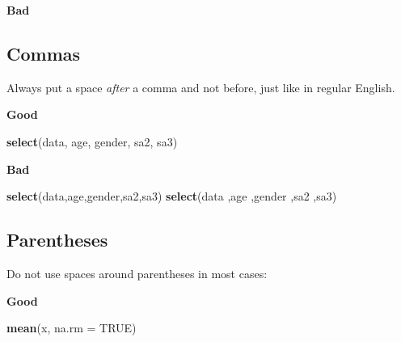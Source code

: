 \documentclass[
]{book}
\newenvironment{Shaded}{\begin{snugshade}}{\end{snugshade}}
\newcommand{\DataTypeTok}[1]{\textcolor[rgb]{0.13,0.29,0.53}{#1}}
\newcommand{\DecValTok}[1]{\textcolor[rgb]{0.00,0.00,0.81}{#1}}
\newcommand{\KeywordTok}[1]{\textcolor[rgb]{0.13,0.29,0.53}{\textbf{#1}}}
\newcommand{\NormalTok}[1]{#1}
\newcommand{\OperatorTok}[1]{\textcolor[rgb]{0.81,0.36,0.00}{\textbf{#1}}}
\newcommand{\OtherTok}[1]{\textcolor[rgb]{0.56,0.35,0.01}{#1}}
\newcommand{\StringTok}[1]{\textcolor[rgb]{0.31,0.60,0.02}{#1}}
\begin{document}
\textbf{Bad}

\begin{Shaded}
\end{Shaded}

\hypertarget{commas}{%
\subsection{Commas}\label{commas}}

Always put a space \emph{after} a comma and not before, just like in regular English.

\textbf{Good}

\begin{Shaded}
\begin{Highlighting}[]
\KeywordTok{select}\NormalTok{(data, age, gender, sa2, sa3)}
\end{Highlighting}
\end{Shaded}

\textbf{Bad}

\begin{Shaded}
\begin{Highlighting}[]
\KeywordTok{select}\NormalTok{(data,age,gender,sa2,sa3)}
\KeywordTok{select}\NormalTok{(data ,age ,gender ,sa2 ,sa3)}
\end{Highlighting}
\end{Shaded}

\hypertarget{parentheses}{%
\subsection{Parentheses}\label{parentheses}}

Do not use spaces around parentheses in most cases:

\textbf{Good}

\begin{Shaded}
\begin{Highlighting}[]
\KeywordTok{mean}\NormalTok{(x, }\DataTypeTok{na.rm =} \OtherTok{TRUE}\NormalTok{)}
\end{Highlighting}
\end{Shaded}
\end{document}
